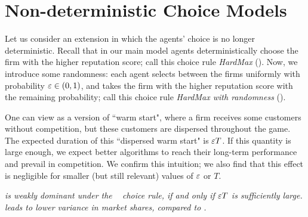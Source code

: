 \documentclass[../competing_bandits.tex]{subfiles}
\begin{document}
\section{Non-deterministic Choice Models}\label{sec:non_greedy}

Let us consider an extension in which the agents' choice is no longer deterministic. Recall that in our main model agents deterministically choose the firm with the higher reputation score; call this choice rule \emph{HardMax} (\HM). Now, we introduce some randomness: each agent selects between the firms uniformly with probability $\varepsilon\in (0,1)$, and takes the firm with the higher reputation score with the remaining probability; call this choice rule \emph{HardMax with randomness} (\HMR).

One can view \HMR as a version of ``warm start", where a firm receives some customers without competition, but these customers are dispersed throughout the game. The expected duration of this ``dispersed warm start" is $\varepsilon T$. If this quantity is large enough, we expect better algorithms to reach their long-term performance and prevail in competition. We confirm this intuition; we also find that this effect is negligible for smaller (but still relevant) values of $\varepsilon$ or $T$.


\begin{finding}\label{find:non_greedy_choice}
\textit{\TS is weakly dominant under the \HMR~ choice rule, if and only if $\varepsilon T$ is sufficiently large. \HMR leads to lower variance in market shares, compared to \HM.}
\end{finding}
\end{document}
